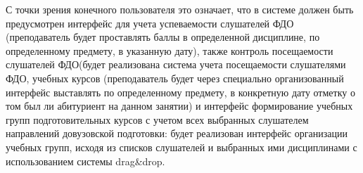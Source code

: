 \hspace*{0.25cm}С точки зрения конечного пользователя это означает, что в системе должен быть предусмотрен интерфейс для учета успеваемости слушателей ФДО (преподаватель будет проставлять баллы в  определенной дисциплине, по определенному предмету, в указанную дату), также контроль посещаемости слушателей ФДО(будет реализована система учета посещаемости слушателями ФДО, учебных курсов (преподаватель будет через специально организованный интерфейс выставлять по определенному предмету, в конкретную дату отметку о том был ли абитуриент на данном занятии) и интерфейс формирование учебных групп подготовительных курсов с учетом всех выбранных слушателем направлений довузовской подготовки: будет реализован интерфейс организации учебных групп, исходя из списков слушателей и выбранных ими дисциплинами с использованием системы drag\&drop.

